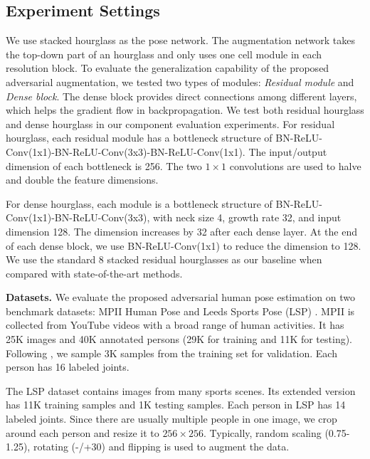 \documentclass[10pt,twocolumn,letterpaper]{article}
\begin{document}
\subsection{Experiment Settings}
We use stacked hourglass \cite{newell2016stacked} as the pose network. The augmentation network takes the top-down part of an hourglass and only uses one cell module in each resolution block. To evaluate the generalization capability of the proposed adversarial augmentation, we tested two types of modules: {\it Residual module}\cite{he2016deep} and {\it Dense block}\cite{huang2016densely}.
The dense block provides direct connections among different layers, which helps the gradient flow in backpropagation.%
We test both residual hourglass and dense hourglass in our component evaluation experiments. For residual hourglass, each residual module has a bottleneck structure of BN-ReLU-Conv(1x1)-BN-ReLU-Conv(3x3)-BN-ReLU-Conv(1x1). The input/output dimension of each bottleneck is 256. The two $1\times 1$ convolutions are used to halve and double the feature dimensions.

For dense hourglass, each module is a bottleneck structure of BN-ReLU-Conv(1x1)-BN-ReLU-Conv(3x3), with neck size 4, growth rate 32, and input dimension 128. The dimension increases by 32 after each dense layer. At the end of each dense block, we use BN-ReLU-Conv(1x1) to reduce the dimension to 128. We use the standard 8 stacked residual hourglasses \cite{newell2016stacked} as our baseline when compared with state-of-the-art methods.

{\bf Datasets.} We evaluate the proposed adversarial human pose estimation on two benchmark datasets: MPII Human Pose \cite{andriluka14cvpr} and  Leeds Sports Pose (LSP) \cite{johnson2010lsp}. MPII is collected from YouTube videos with a broad range of human activities. It has 25K images and 40K annotated persons (29K for training and 11K for testing). Following \cite{tompson2014joint}, we sample 3K samples from the training set for validation. Each person has 16 labeled joints. 

The LSP dataset contains images from many sports scenes. Its extended version has 11K training samples and 1K testing samples. Each person in LSP has 14 labeled joints. Since there are usually multiple people in one image, we crop around each person and resize it to $256\times 256$. Typically, random scaling (0.75-1.25), rotating (-/+30\textdegree) and flipping is used to augment the data.
\end{document}
